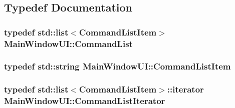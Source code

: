 \subsection{Typedef Documentation}
\hypertarget{namespaceMainWindowUI_a746ebba19502abcb8ef74beecf9c6acf}{
\subsubsection[{Command\-List}]{\setlength{\rightskip}{0pt plus 5cm}typedef std\-::list$<${\bf Command\-List\-Item}$>$ {\bf Main\-Window\-U\-I\-::\-Command\-List}}}\label{namespaceMainWindowUI_a746ebba19502abcb8ef74beecf9c6acf}
\hypertarget{namespaceMainWindowUI_ab4a56a6d14c3fc1c53d1f1373a9033d3}{
\subsubsection[{Command\-List\-Item}]{\setlength{\rightskip}{0pt plus 5cm}typedef std\-::string {\bf Main\-Window\-U\-I\-::\-Command\-List\-Item}}}\label{namespaceMainWindowUI_ab4a56a6d14c3fc1c53d1f1373a9033d3}
\hypertarget{namespaceMainWindowUI_acbc9d84cd79a821b6ff30f5ff94e9321}{
\subsubsection[{Command\-List\-Iterator}]{\setlength{\rightskip}{0pt plus 5cm}typedef std\-::list$<${\bf Command\-List\-Item}$>$\-::iterator {\bf Main\-Window\-U\-I\-::\-Command\-List\-Iterator}}}\label{namespaceMainWindowUI_acbc9d84cd79a821b6ff30f5ff94e9321}
